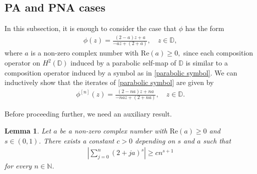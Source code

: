 \documentclass[11pt]{amsart}
\theoremstyle{plain}
\newtheorem{lemma}[definition]{Lemma}
\theoremstyle{remark}
\theoremstyle{plain}
\begin{document}
\subsection{PA and PNA cases} In this subsection, it is enough to consider the case that $\phi$ has the form
\begin{align}\label{parabolic symbol}
\phi(z)=\frac{(2-a)z+a}{-az+(2+a)}, \quad z\in \mathbb{D},
\end{align}
where $a$ is a non-zero complex number with $\mathrm{Re}(a)\geq0,$ since each composition operator on $H^2(\mathbb{D})$ induced by a parabolic self-map of $\mathbb{D}$ is similar to a composition operator induced by a symbol as in \eqref{parabolic symbol}. We can inductively show that the iterates of \eqref{parabolic symbol} are given by
\begin{align}\label{equality1}
\phi^{[n]}(z)=\frac{(2-na)z+na}{-naz+(2+na)}, \quad z\in \mathbb{D}. 
\end{align}

Before proceeding further, we need an auxiliary result.



\begin{lemma}\label{lemma} 
Let $a$ be a non-zero complex number with $\mathrm{Re}(a)\geq 0$ and $s\in (0,1)$. There exists a constant $c > 0$ depending on $s$ and $a$ such that 
\begin{align} \left|\sum\limits_{j = 0}^{n} (2 + ja)^s \right|\geq c n^{s + 1}
\end{align}
for every $n \in \mathbb{N}$.
\end{lemma}
\end{document}
